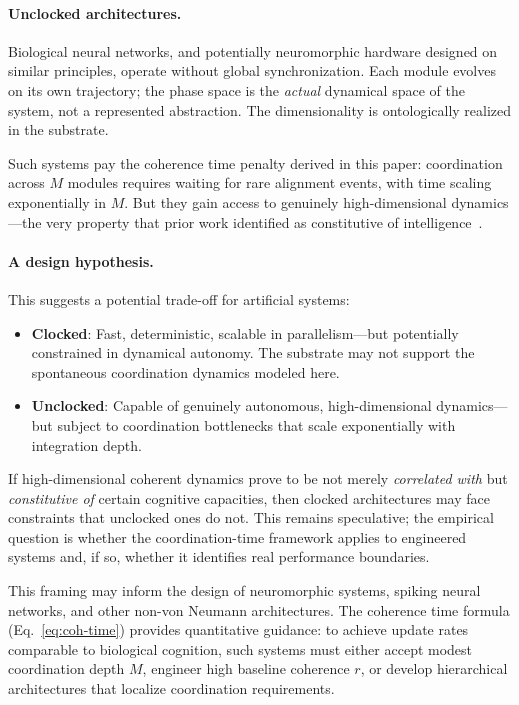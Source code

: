 \documentclass[12pt]{article}
\begin{document}
\paragraph{Unclocked architectures.} Biological neural networks, and potentially neuromorphic hardware designed on similar principles, operate without global synchronization. Each module evolves on its own trajectory; the phase space is the \emph{actual} dynamical space of the system, not a represented abstraction. The dimensionality is ontologically realized in the substrate.

Such systems pay the coherence time penalty derived in this paper: coordination across $M$ modules requires waiting for rare alignment events, with time scaling exponentially in $M$. But they gain access to genuinely high-dimensional dynamics---the very property that prior work identified as constitutive of intelligence~\cite{todd2025intelligence}.

\paragraph{A design hypothesis.} This suggests a potential trade-off for artificial systems:
\begin{itemize}
\item \textbf{Clocked}: Fast, deterministic, scalable in parallelism---but potentially constrained in dynamical autonomy. The substrate may not support the spontaneous coordination dynamics modeled here.
\item \textbf{Unclocked}: Capable of genuinely autonomous, high-dimensional dynamics---but subject to coordination bottlenecks that scale exponentially with integration depth.
\end{itemize}

If high-dimensional coherent dynamics prove to be not merely \emph{correlated with} but \emph{constitutive of} certain cognitive capacities, then clocked architectures may face constraints that unclocked ones do not. This remains speculative; the empirical question is whether the coordination-time framework applies to engineered systems and, if so, whether it identifies real performance boundaries.

This framing may inform the design of neuromorphic systems, spiking neural networks, and other non-von Neumann architectures. The coherence time formula (Eq.~\ref{eq:coh-time}) provides quantitative guidance: to achieve update rates comparable to biological cognition, such systems must either accept modest coordination depth $M$, engineer high baseline coherence $r$, or develop hierarchical architectures that localize coordination requirements.
\end{document}
